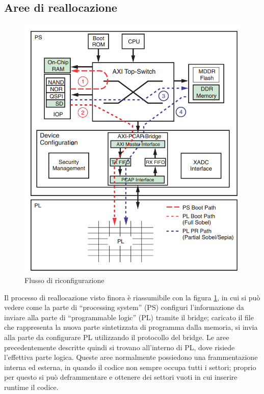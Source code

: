 \documentclass[11pt]{article} %
\begin{document}
\subsection{Aree di reallocazione}

\begin{figure}
\centering
\includegraphics[scale=0.5]{protocollo_riconfigurazione.png}
\caption{Flusso di riconfigurazione}\label{fig:2}
\end{figure}

Il processo di reallocazione visto finora è riassumibile con la figura \ref{fig:2}, in cui si può vedere come la parte di  ``processing system'' (PS) configuri l'informazione da inviare alla parte di ``programmable logic'' (PL) tramite il bridge; caricato il file che rappresenta la nuova parte sintetizzata di programma dalla memoria, si invia alla parte da configurare PL utilizzando il protocollo del bridge.
Le aree precedentemente descritte quindi si trovano all'interno di PL, dove risiede l'effettiva parte logica. Queste aree normalmente possiedono una frammentazione interna ed esterna, in quando il codice non sempre occupa tutti i settori; proprio per questo si può deframmentare e ottenere dei settori vuoti in cui inserire runtime il codice. 
\end{document}
